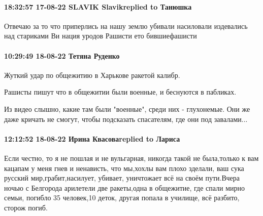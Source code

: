 \paragraph{18:32:57 17-08-22 SLAVIK Slavikreplied to Танюшка}

Отвечаю за то что приперлись на нашу землю убивали насиловали издевались над
стариками Ви нация уродов Рашисти ето бившиефашисти

\paragraph{10:29:49 18-08-22 Тетяна Руденко}

Жуткий удар по общежитию в Харькове ракетой калибр.

Рашисты пишут что в общежитии были военные, и беснуются в пабликах.

Из видео слышно, какие там были "военные", среди них - глухонемые. Они же даже
кричать не смогут, чтобы подсказать спасателям, где они под завалами...

\paragraph{12:12:52 18-08-22 Ирина Квасоваreplied to Лариса}

Если честно, то я не пошлая и не вульгарная, никогда такой не была,только к вам
кацапам у меня гнев и ненависть, что мы,хохлы вам плохо зделали, ваш сука
русский мир,грабит,насилует, убивает, уничтожает всё на своём пути.Вчера ночью
с Белгорода арилетели две ракеты,одна в общежитие, где спали мирно семьи,
погибло 35 человек,10 деток, другая попала в училище, всё разбито, сторож
погиб.
